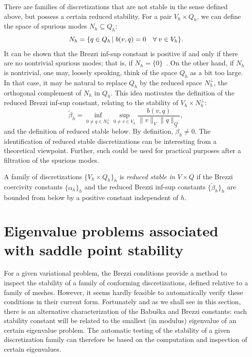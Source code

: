 There are families of discretizations that are not stable in the sense
defined above, but possess a certain reduced stability. For a pair
$V_h \times Q_h$, we can define the space of spurious modes $N_h
\subseteq Q_h$:
\begin{equation*}
  N_h
  = \{q \in Q_h \, | \; b(v, q) = 0 \quad
  \forall \; v \in V_h\}.
\end{equation*}
It can be shown that the Brezzi inf-sup constant is positive if and
only if there are no nontrivial spurious modes; that is, if $N_h = \{
0 \}$~\cite{Qin1994}.  On the other hand, if $N_h$ is
nontrivial, one may, loosely speaking, think of the space $Q_h$ as a
bit too large.  In that case, it may be natural to replace $Q_h$ by
the reduced space $N_h^{\perp}$, the orthogonal complement of $N_h$ in
$Q_h$. This idea motivates the definition of the reduced Brezzi
inf-sup constant, relating to the stability of $V_h \times
N_h^{\perp}$:
\begin{equation}
  \label{rognes:eq:reduced:infsup}
  \tilde \beta_h =
  \inf_{0 \not = q \in N_h^{\perp}}
  \sup_{0 \not = v \in V_h}
  \frac{b(v, q)}
       {\|v\|_{V} \|q\|_{Q}},
\end{equation}
and the definition of reduced stable below. By definition, $\tilde
\beta_h \not = 0$. The identification of reduced stable
discretizations can be interesting from a theoretical
viewpoint. Further, such could be used for practical purposes after a
filtration of the spurious modes.
\begin{definition}
  \label{rognes:def:reduced_stable}
  A family of discretizations $\{V_h \times Q_h\}_h$ is \emph{reduced
    stable in $V \times Q$} if the Brezzi coercivity constants
  $\{\alpha_h\}_h$ and the reduced Brezzi inf-sup constants $\{ \tilde
  \beta_h \}_h$ are bounded from below by a positive constant
  independent of $h$.
\end{definition}


\section{Eigenvalue problems associated with saddle point stability}

For a given variational problem, the Brezzi conditions provide a
method to inspect the stability of a family of conforming
discretizations, defined relative to a family of meshes. However, it
seems hardly feasible to automatically verify these conditions in
their current form. Fortunately and as we shall see in this section,
there is an alternative characterization of the Babu\v ska and Brezzi
constants: each stability constant will be related to the smallest (in
modulus) eigenvalue of an certain eigenvalue problem. The automatic
testing of the stability of a given discretization family can
therefore be based on the computation and inspection of certain
eigenvalues.

